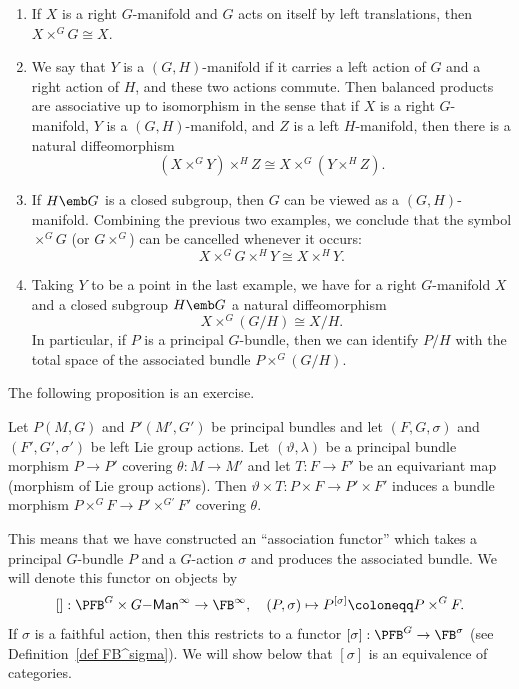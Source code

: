 \begin{example}
    \begin{enumerate}
        \item If $X$ is a right $G$-manifold and $G$ acts on itself by left translations, then $X\times^G G\cong X$.
        \item We say that $Y$ is a $(G,H)$-manifold if it carries a left action of $G$ and a right action of $H$, and these two actions commute. Then balanced products are associative up to isomorphism in the sense that if $X$ is a right $G$-manifold, $Y$ is a $(G,H)$-manifold, and $Z$ is a left $H$-manifold, then there is a natural diffeomorphism
        \[(X\times^G Y)\times^H Z\cong X\times^G (Y\times^H Z).\]
        \item If $H\emb G$ is a closed subgroup, then $G$ can be viewed as a $(G,H)$-manifold. Combining the previous two examples, we conclude that the symbol $\times^G G$ (or $G\times^G$) can be cancelled whenever it occurs:
        \[X\times^G G\times^H Y\cong X\times^H Y.\]
        \item Taking $Y$ to be a point in the last example, we have for a right $G$-manifold $X$ and a closed subgroup $H\emb G$ a natural diffeomorphism
        \[X\times^G (G\slash H)\cong X\slash H.\]
        In particular, if $P$ is a principal $G$-bundle, then we can identify $P\slash H$ with the total space of the associated bundle $P\times^G (G\slash H)$.
    \end{enumerate}
\end{example}

The following proposition is an exercise.
\begin{prop}[{{\cite[Prop.~1.2.2]{RS2}}}]\label{prop 1.2.2 RS2}
    Let $P(M,G)$ and $P'(M',G')$ be principal bundles and let $(F,G,\sigma)$ and $(F',G',\sigma')$ be left Lie group actions. Let $(\vartheta,\lambda)$ be a principal bundle morphism $P\to P'$ covering $\theta:M\to M'$ and let $T:F\to F'$ be an equivariant map (morphism of Lie group actions). Then $\vartheta\times T:P\times F\to P'\times F'$ induces a bundle morphism $P\times^G F\to P'\times^{G'} F'$ covering $\theta$.
\end{prop}

This means that we have constructed an ``association functor'' which takes a principal $G$-bundle $P$ and a $G$-action $\sigma$ and produces the associated bundle. We will denote this functor on objects by
\[[]:\PFB^G\times G\mathsf{-Man}^\infty \to \FB^\infty,\quad (P,\sigma)\mapsto P^{[\sigma]}\coloneqq P\times^G F.\]
If $\sigma$ is a faithful action, then this restricts to a functor
$[\sigma]:\PFB^G\to \FB^\sigma$ (see Definition~\ref{def FB^sigma}). We will show below that $[\sigma]$ is an equivalence of categories.

